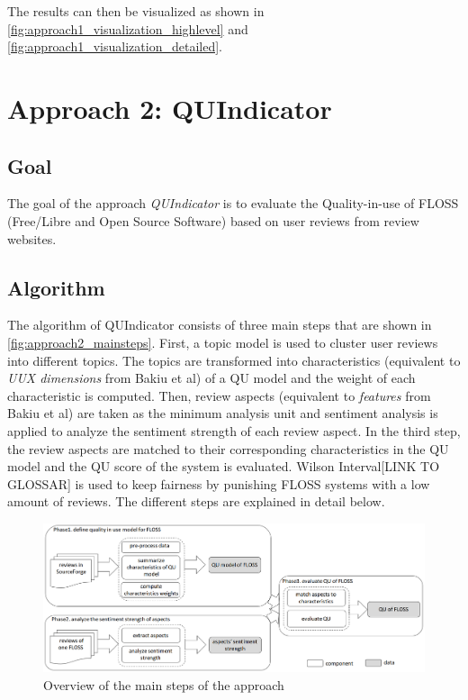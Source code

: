 The results can then be visualized as shown in \autoref{fig:approach1_visualization_highlevel} and \autoref{fig:approach1_visualization_detailed}.

\section{Approach 2: QUIndicator}
\subsection{Goal}
The goal of the approach \textit{QUIndicator} is to evaluate the Quality-in-use of FLOSS (Free/Libre and Open Source Software) based on user reviews from review websites.

\subsection{Algorithm}
The algorithm of QUIndicator consists of three main steps that are shown in \autoref{fig:approach2_mainsteps}. First, a topic model is used to cluster user reviews into different topics. The topics are transformed into characteristics (equivalent to \textit{UUX dimensions} from Bakiu et al) of a QU model and the weight of each characteristic is computed. Then, review aspects (equivalent to \textit{features} from Bakiu et al) are taken as the minimum analysis unit and sentiment analysis is applied to analyze the sentiment strength of each review aspect. In the third step, the review aspects are matched to their corresponding characteristics in the QU model and the QU score of the system is evaluated. Wilson Interval[LINK TO GLOSSAR] is used to keep fairness by punishing FLOSS systems with a low amount of reviews. The different steps are explained in detail below.

\begin{figure}
    \centering
    \includegraphics[width=\textwidth]{images/Thema4_Approach2_MainSteps.png}
    \caption{Overview of the main steps of the approach \cite[Figure 1]{Qian2016}}
    \label{fig:approach2_mainsteps}
\end{figure}

